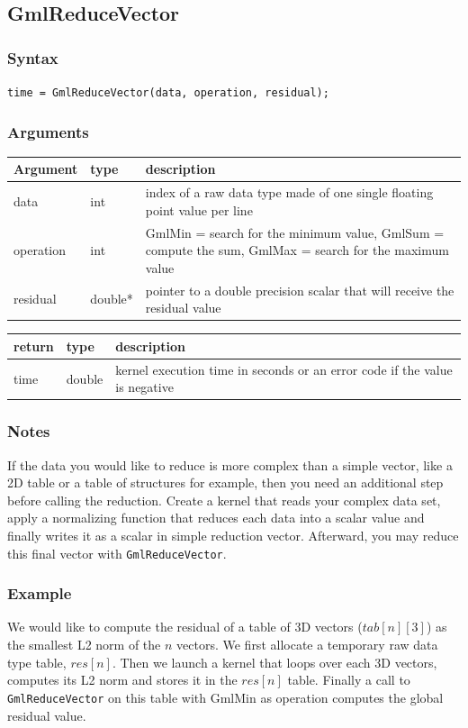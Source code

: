\documentclass[a4paper,12pt]{article}
\begin{document}
\subsection{GmlReduceVector}
\subsubsection*{Syntax}
{\tt time = GmlReduceVector(data, operation, residual);}
\subsubsection*{Arguments}

\begin{tabular}{|m{2cm}|m{1.5cm}|m{10.5cm}|}
\hline
Argument   & type    & description \\
\hline
data       & int     & index of a raw data type made of one single floating point value per line \\
\hline
operation  & int     & GmlMin = search for the minimum value, GmlSum = compute the sum, GmlMax = search for the maximum value \\
\hline
residual   & double* & pointer to a double precision scalar that will receive the residual value \\
\hline
\end{tabular}

\medskip

\begin{tabular}{|m{2cm}|m{1.5cm}|m{10.5cm}|}
\hline
return     & type   & description \\
\hline
time       & double & kernel execution time in seconds or an error code if the value is negative \\
\hline
\end{tabular}
\subsubsection*{Notes}
If the data you would like to reduce is more complex than a simple vector, like a 2D table or a table of structures for example, then you need an additional step before calling the reduction. Create a kernel that reads your complex data set, apply a normalizing function that reduces each data into a scalar value and finally writes it as a scalar in simple reduction vector. Afterward, you may reduce this final vector with {\tt GmlReduceVector}.

\subsubsection*{Example}
We would like to compute the residual of a table of 3D vectors ($tab[n][3]$) as the smallest L2 norm of the $n$ vectors. We first allocate a temporary raw data type table, $res[n]$. Then we launch a kernel that loops over each 3D vectors, computes its L2 norm and stores it in the $res[n]$ table. Finally a call to {\tt GmlReduceVector} on this table with GmlMin as operation computes the global residual value.
\end{document}
